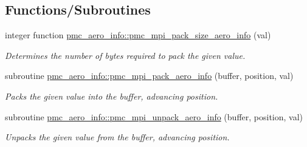 \subsection*{Functions/\+Subroutines}
\begin{DoxyCompactItemize}
\item 
integer function \mbox{\hyperlink{namespacepmc__aero__info_a15989c385217c4181bc788242365712d}{pmc\+\_\+aero\+\_\+info\+::pmc\+\_\+mpi\+\_\+pack\+\_\+size\+\_\+aero\+\_\+info}} (val)
\begin{DoxyCompactList}\small\item\em Determines the number of bytes required to pack the given value. \end{DoxyCompactList}\item 
subroutine \mbox{\hyperlink{namespacepmc__aero__info_a2e8144e95d3c134b5e08eca2d17aca32}{pmc\+\_\+aero\+\_\+info\+::pmc\+\_\+mpi\+\_\+pack\+\_\+aero\+\_\+info}} (buffer, position, val)
\begin{DoxyCompactList}\small\item\em Packs the given value into the buffer, advancing position. \end{DoxyCompactList}\item 
subroutine \mbox{\hyperlink{namespacepmc__aero__info_a00bba9f51f794c076d7cb4eeb7f25eac}{pmc\+\_\+aero\+\_\+info\+::pmc\+\_\+mpi\+\_\+unpack\+\_\+aero\+\_\+info}} (buffer, position, val)
\begin{DoxyCompactList}\small\item\em Unpacks the given value from the buffer, advancing position. \end{DoxyCompactList}\end{DoxyCompactItemize}
